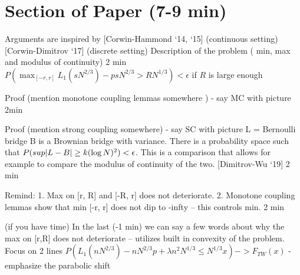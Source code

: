 \documentclass[9pt,t]{beamer}
\DeclarePairedDelimiter\abs{\lvert}{\rvert}
\begin{document}
\section{Section of Paper (7-9 min)}
\begin{frame}
Arguments are inspired by [Corwin-Hammond ‘14, ‘15] (continuous setting) [Corwin-Dimitrov ‘17] (discrete setting) Description of the problem ( min, max and modulus of continuity)
2 min   $P( \max_{[-r, r]} L_1(sN^{2/3}) - psN^{2/3}  > RN^{1/3} ) < \epsilon$ if $R$ is large enough  
\end{frame}
\begin{frame}
Proof  (mention monotone coupling lemmas somewhere ) - say MC with picture
2min
\end{frame}
\begin{frame}
Proof  (mention strong coupling somewhere) - say SC with picture 
L = Bernoulli bridge B is a Brownian bridge with variance. There is a probability space such that $P( sup \abs*{L - B} \geq k (\log N)^2) < \epsilon$. This is a comparison that allows for example to compare the modulus of continuity of the two. [Dimitrov-Wu ‘19]
2 min
\end{frame}
\begin{frame}
Remind: 1. Max on [r, R] and [-R, r] does not deteriorate. 2. Monotone coupling lemmas show that min [-r, r] does not dip to -infty -- this controls min. 
2 min 
\end{frame}
\begin{frame}
(if you have time) In the last (-1 min) we can say a few words about why the max on [r,R] does not deteriorate -- utilizes built in convexity of the problem. Focus on 2 lines 
$P(L_1(nN^{2/3}) - nN^{2/3} p + \lambda n^2 N^{1/3} \leq N^{1/3} x) -> F_{TW}(x)$ - emphasize the parabolic shift
\end{frame}
\end{document}
